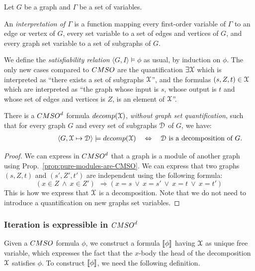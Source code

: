 \begin{definition} Let $G$ be a graph and $\Gamma$ be a set of variables.  

An \emph{interpretation of $\Gamma$} is a function mapping every first-order variable of $\Gamma$ to an edge or vertex of $G$, every set variable to a set of edges and vertices of $G$, and every graph set variable to a set of subgraphs of $G$.    

We define the \emph{satisfiability relation} $\langle G, I\rangle\models \phi$ as usual, by induction on  $\phi$. The only new cases compared to $\CMSO$ are the quantification  $\exists \mathcal X$ which is interpreted as ``there exists a set of subgraphs $\mathcal X$'', and the formulas $(s,Z,t)\in \mathcal X$ which are interpreted as ``the graph whose input is $s$, whose output is $t$ and whose set of edges and vertices is $Z$, is an element of $\mathcal X$''.  
\end{definition}
\begin{proposition}\label{prop:def-decomp}
There is a $\CMSOd$ formula $\mathsf{decomp}(\cX)$, \emph{without graph set quantification}, such that for every graph $G$ and every set of subgraphs $\mathcal D$ of $G$, we have:
\begin{align*}
\qquad\qquad\qquad\langle G, \cX\mapsto \cD\rangle\models \mathsf{decomp}(\cX)\quad \Leftrightarrow \quad  \cD \text{ is a decomposition of } G.
\end{align*}
\end{proposition}
\begin{proof} 
We can express in $\CMSOd$ that a graph is a module of another graph using Prop.~\ref{prop:pure-modules-are-CMSO}. We can express that two graphs $(s,Z,t)$ and $(s',Z',t')$ are independent using the following formula:
$$ (x\in Z\  \wedge\  x\in Z')\ \ \Rightarrow (x=s\  \vee\  x=s'\  \vee\  x=t\ \vee\ x=t')$$
 This is how we express that $\mathcal X$ is a decomposition. Note that we do not need to introduce a  quantification on new graphs set variables. 
\end{proof}


\subsubsection{Iteration is expressible in $\CMSOd$}

Given a $\CMSO$ formula $\phi$, we construct a formula $\left\llbracket {\phi}\right\rrbracket$ having $\mathcal X$ as unique free variable, which expresses the fact that the $x$-body the head of the decomposition $\mathcal X$ satisfies $\phi$. To construct $\left\llbracket {\phi}\right\rrbracket$, we need the following definition.

